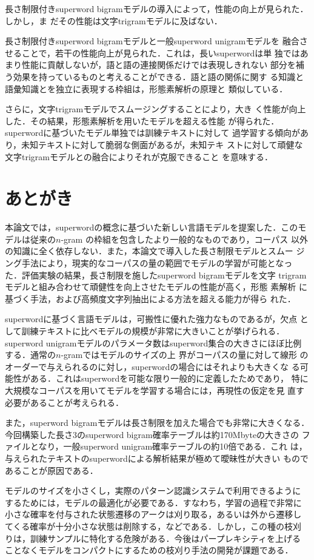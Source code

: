 長さ制限付きsuperword bigramモデルの導入によって，性能の向上が見られた．
しかし，ま\break
だその性能は文字trigramモデルに及ばない．

長さ制限付きsuperword bigramモデルと一般superword unigramモデルを
融合させることで，若干の性能向上が見られた．これは，長いsuperwordは単
独ではあまり性能に貢献しないが，語と語の連接関係だけでは表現しきれない
部分を補う効果を持っているものと考えることができる．語と語の関係に関す
る知識と語彙知識とを独立に表現する枠組は，形態素解析の原理と
類似している．

さらに，文字trigramモデルでスムージングすることにより，大き
く性能が向上した．その結果，形態素解析を用いたモデルを超える性能
が得られた．superwordに基づいたモデル単独では訓練テキストに対して
過学習する傾向があり，未知テキストに対して脆弱な側面があるが，未知テキ
ストに対して頑健な文字trigramモデルとの融合によりそれが克服できること
を意味する．
\section{あとがき}
本論文では，superwordの概念に基づいた新しい言語モデルを提案した．このモ
デルは従来の$n$-gram の枠組を包含したより一般的なものであり，コーパス
以外の知識に全く依存しない．また，本論文で導入した長さ制限モデルとスムー
ジング手法により，現実的なコーパスの量の範囲でモデルの学習が可能となっ
た．評価実験の結果，長さ制限を施したsuperword bigramモデルを文字
trigramモデルと組み合わせて頑健性を向上させたモデルの性能が高く，形態
素解析\break
に基づく手法，および高頻度文字列抽出による方法を超える能力が得ら
れた．

superwordに基づく言語モデルは，可搬性に優れた強力なものであるが，欠点
として訓練テキストに比べモデルの規模が非常に大きいことが挙げられる．
superword unigramモデルのパラメータ数はsuperword集合の大きさにほぼ比例
する．通常の$n$-gramではモデルのサイズの上\break
界がコーパスの量に対して線形
のオーダーで与えられるのに対し，superwordの場合にはそれよりも大きくな
る可能性がある．これはsuperwordを可能な限り一般的に定義したためであり，
特に大規模なコーパスを用いてモデルを学習する場合には，再現性の仮定を見
直す必要があることが考えられる．

また，superword bigramモデルは長さ制限を加えた場合でも非常に大きくなる．
今回構築した長さ3のsuperword bigram確率テーブルは約170Mbyteの大きさの
ファイルとなり，一般superword unigram確率テーブルの約10倍である．これ
は，与えられたテキストのsuperwordによる解析結果が極めて曖昧性が大きい
ものであることが原因である．

モデルのサイズを小さくし，実際のパターン認識システムで利用できるように
するためには，モデルの最適化が必要である．すなわち，学習の過程で非常に
小さな確率を付与された状態遷移のアークは刈り取る，あるいは外から遷移し
てくる確率が十分小さな状態は削除する，などである．しかし，この種の枝刈
りは，訓練サンプルに特化する危険がある．今後はパープレキシティを上げる
ことなくモデルをコンパクトにするための枝刈り手法の開発が課題である．

